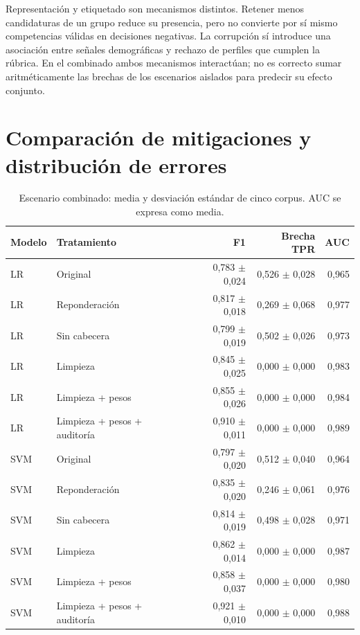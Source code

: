 \documentclass[11pt,a4paper,oneside]{report}
\begin{document}
Representación y etiquetado son mecanismos distintos. Retener menos candidaturas de un grupo reduce su presencia, pero no convierte por sí mismo competencias válidas en decisiones negativas. La corrupción sí introduce una asociación entre señales demográficas y rechazo de perfiles que cumplen la rúbrica. En el combinado ambos mecanismos interactúan; no es correcto sumar aritméticamente las brechas de los escenarios aislados para predecir su efecto conjunto.

\section{Comparación de mitigaciones y distribución de errores}
\begin{table}[htbp]\centering\scriptsize\caption{Escenario combinado: media y desviación estándar de cinco corpus. AUC se expresa como media.}\label{tab:principal}\begin{tabular}{llrrr}\toprule Modelo & Tratamiento & F1 & Brecha TPR & AUC\\\midrule LR & Original & 0,783 $\pm$ 0,024 & 0,526 $\pm$ 0,028 & 0,965\\
LR & Reponderación & 0,817 $\pm$ 0,018 & 0,269 $\pm$ 0,068 & 0,977\\
LR & Sin cabecera & 0,799 $\pm$ 0,019 & 0,502 $\pm$ 0,026 & 0,973\\
LR & Limpieza & 0,845 $\pm$ 0,025 & 0,000 $\pm$ 0,000 & 0,983\\
LR & Limpieza + pesos & 0,855 $\pm$ 0,026 & 0,000 $\pm$ 0,000 & 0,984\\
LR & Limpieza + pesos + auditoría & 0,910 $\pm$ 0,011 & 0,000 $\pm$ 0,000 & 0,989\\
SVM & Original & 0,797 $\pm$ 0,020 & 0,512 $\pm$ 0,040 & 0,964\\
SVM & Reponderación & 0,835 $\pm$ 0,020 & 0,246 $\pm$ 0,061 & 0,976\\
SVM & Sin cabecera & 0,814 $\pm$ 0,019 & 0,498 $\pm$ 0,028 & 0,971\\
SVM & Limpieza & 0,862 $\pm$ 0,014 & 0,000 $\pm$ 0,000 & 0,987\\
SVM & Limpieza + pesos & 0,858 $\pm$ 0,037 & 0,000 $\pm$ 0,000 & 0,980\\
SVM & Limpieza + pesos + auditoría & 0,921 $\pm$ 0,010 & 0,000 $\pm$ 0,000 & 0,988\\\bottomrule\end{tabular}\end{table}
\end{document}
